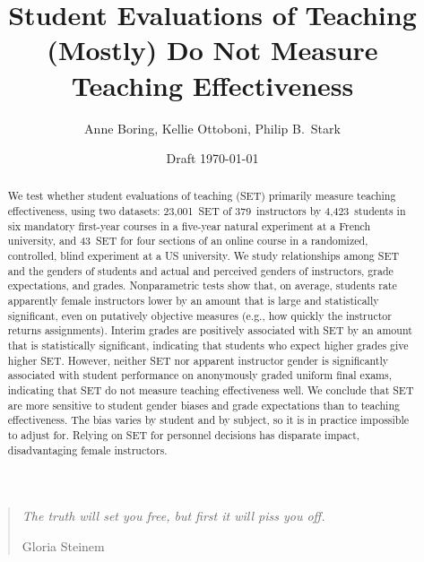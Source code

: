 \documentclass[12pt]{article}
\title{Student Evaluations of Teaching (Mostly) Do Not Measure Teaching Effectiveness}
\author{Anne Boring, Kellie Ottoboni, Philip B.~Stark}
\date{Draft \today}
\begin{document}
\maketitle

\newpage
\begin{quotation}
    \emph{The truth will set you free, but first it will piss you off.}
    
     \hfill Gloria Steinem
\end{quotation}

\begin{abstract}

We test whether student evaluations of teaching (SET) 
primarily measure teaching effectiveness, using 
two datasets:
23,001~SET of 379~instructors by 4,423~students in six 
mandatory first-year courses in a five-year natural experiment at a French university, 
and
43~SET for four sections of an online course in a randomized, controlled, 
blind experiment at a US university.
We study relationships among SET and the genders of students and actual and
perceived genders of instructors, grade expectations, and grades.
Nonparametric tests show that, on average, students rate apparently female instructors lower 
by an amount that is 
large and statistically significant, even on putatively objective measures (e.g., how
quickly the instructor returns assignments).
Interim grades are positively associated with SET
by an amount that is statistically significant, indicating that students who expect
higher grades give higher SET.
However, neither SET nor apparent instructor gender is significantly associated 
with student performance on anonymously graded uniform final exams, indicating
that SET do not measure teaching effectiveness well. 
We conclude that SET are more sensitive to student gender biases and grade 
expectations than to teaching effectiveness.
The bias varies by student and by subject, so it is in practice impossible to adjust for. 
Relying on SET for personnel decisions has disparate impact, disadvantaging 
female instructors.




\end{abstract}
\end{document}
